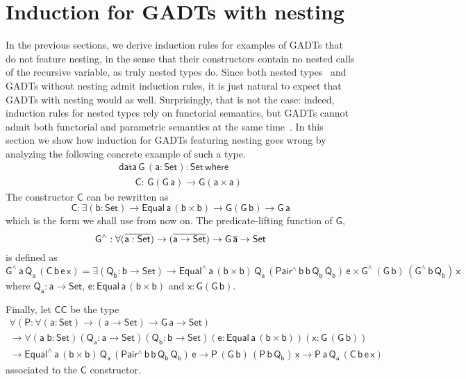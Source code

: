 \documentclass[acmsmall,screen,review,anonymous]{acmart}
\theoremstyle{definition}
\begin{document}
\section{Induction for GADTs with nesting}\label{sec:GADT-nested}

In the previous sections,
we derive induction rules for examples of GADTs that do not feature nesting,
in the sense that their constructors contain no nested calls of the recursive variable,
as truly nested types do.
Since both nested types~\cite{jp20}
and GADTs without nesting admit induction rules,
it is just natural to expect that GADTs with nesting would as well.
Surprisingly, that is not the case:
indeed, induction rules for nested types rely on functorial semantics,
but GADTs cannot admit both functorial and parametric semantics at the same time~\cite{HaskellPaper}.
In this section we show how induction for GADTs featuring nesting goes wrong
by analyzing the following concrete example of such a type.
\begin{equation}
\begin{array}{l}
\mathsf{data\, G\,(a : Set) : Set\,where}\\
\mathsf{\;\;\;\;\;\;C :\, G(G\,a) \to G(a \times a)}
\end{array}
\end{equation}
The constructor $\mathsf{C}$ can be rewritten as
\[
\mathsf{C : \exists (b : Set) \to Equal\,a\,(b \times b) \to G(G\,b) \to G\,a}
\]
which is the form we shall use from now on.
The predicate-lifting function of $\mathsf{G}$,
\[
\mathsf{G^{\wedge} : \forall (\overline{a : Set}) \to (\overline{a \to Set}) \to G\,\overline{a} \to Set}
\]
is defined as
\[
\mathsf{G^{\wedge}\,a\,Q_a\,(C\,b\,e\,x)
= \exists (Q_b : b \to Set)
\to Equal^{\wedge}\,a\,(b \times b)\,Q_a\,(Pair^{\wedge}\,b\,b\,Q_b\,Q_b)\,e
\times G^{\wedge}\,(G\,b)\,(G^{\wedge}\,b\,Q_b)\,x}
\]
where $\mathsf{Q_a : a \to Set}$, $\mathsf{e : Equal\,a\,(b \times b)}$ and $\mathsf{x : G(G\,b)}$.

Finally, let $\mathsf{CC}$ be the type
\begin{multline*}
\mathsf{\forall (P : \forall (a : Set) \to (a \to Set) \to G\,a \to Set)} \\
\mathsf{\to \forall (a\;b : Set) (Q_a : a \to Set) (Q_b : b \to Set) (e : Equal\,a\,(b \times b)) (x : G\,(G\,b))} \\
\mathsf{\to Equal^{\wedge}\,a\,(b \times b)\,Q_a\,(Pair^{\wedge}\,b\,b\,Q_b\,Q_b)\,e
	\to P\,(G\,b)\,(P\,b\,Q_b)\,x
	\to P\,a\,Q_a\,(C\,b\,e\,x)}
\end{multline*}
associated to the $\mathsf{C}$ constructor.
\end{document}
